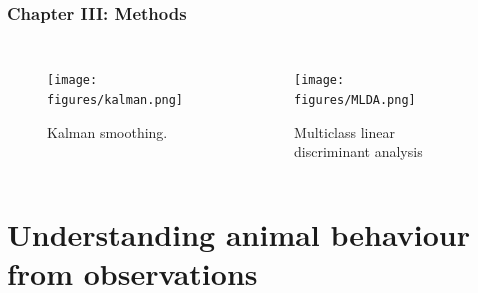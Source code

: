 \documentclass[aspectratio=169]{beamer}
\begin{document}

\begin{frame}[plain]
    \frametitle{Chapter III: Methods}
    \begin{columns}[t] 
        \begin{figure}
            \centering
            \texttt{[image: figures/kalman.png]}
            \caption{Kalman smoothing.}
        \end{figure}
        \begin{figure}
            \centering
            \texttt{[image: figures/MLDA.png]}
            \caption{Multiclass linear discriminant analysis}
        \end{figure}
    \end{columns}
\end{frame}

\section{Understanding animal behaviour from observations} 
\end{document}
